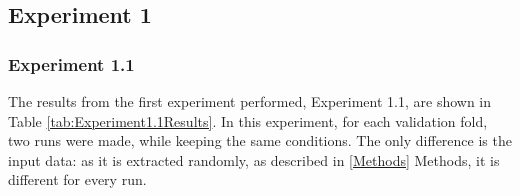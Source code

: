 \subsection{Experiment 1}

\subsubsection{Experiment 1.1}

The results from the first experiment performed, Experiment 1.1, are shown in Table \ref{tab:Experiment1.1Results}. In this experiment, for each validation fold, two runs were made, while keeping the same conditions. The only difference is the input data: as it is extracted randomly, as described in \ref{Methods} Methods, it is different for every run. 

\begin{table}[!ht]
	\caption{Dice scores for every vendor and fluid for the runs done in Experiment 1.1. The conditions were the same for both sets except the extracted patches, which are different in every run due to the random patch extraction method used.}
	\centering
\end{table}

